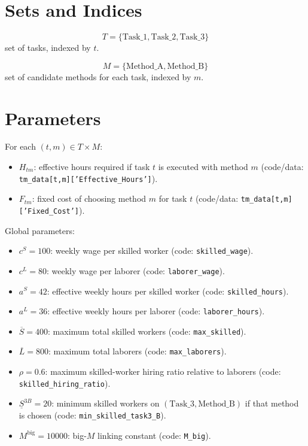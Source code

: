 \section*{Sets and Indices}

\[
T=\{\text{Task\_1},\text{Task\_2},\text{Task\_3}\}
\]
set of tasks, indexed by \(t\).

\[
M=\{\text{Method\_A},\text{Method\_B}\}
\]
set of candidate methods for each task, indexed by \(m\).

\section*{Parameters}

For each \((t,m)\in T\times M\):
\begin{itemize}
    \item \(H_{tm}\): effective hours required if task \(t\) is executed with method \(m\) (code/data: \texttt{tm\_data[t,m]['Effective\_Hours']}).
    \item \(F_{tm}\): fixed cost of choosing method \(m\) for task \(t\) (code/data: \texttt{tm\_data[t,m]['Fixed\_Cost']}).
\end{itemize}

Global parameters:
\begin{itemize}
    \item \(c^S=100\): weekly wage per skilled worker (code: \texttt{skilled\_wage}).
    \item \(c^L=80\): weekly wage per laborer (code: \texttt{laborer\_wage}).
    \item \(a^S=42\): effective weekly hours per skilled worker (code: \texttt{skilled\_hours}).
    \item \(a^L=36\): effective weekly hours per laborer (code: \texttt{laborer\_hours}).
    \item \(\overline S=400\): maximum total skilled workers (code: \texttt{max\_skilled}).
    \item \(\overline L=800\): maximum total laborers (code: \texttt{max\_laborers}).
    \item \(\rho=0.6\): maximum skilled-worker hiring ratio relative to laborers (code: \texttt{skilled\_hiring\_ratio}).
    \item \(\underline S^{3B}=20\): minimum skilled workers on \((\text{Task\_3},\text{Method\_B})\) if that method is chosen (code: \texttt{min\_skilled\_task3\_B}).
    \item \(M^{\text{big}}=10000\): big-\(M\) linking constant (code: \texttt{M\_big}).
\end{itemize}

